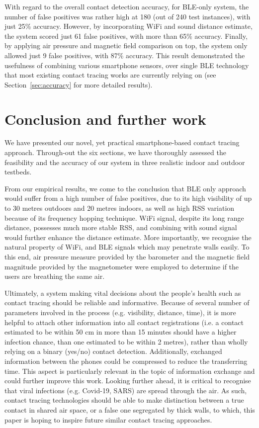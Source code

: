 \documentclass[graybox]{svmult}
\begin{document}
With regard to the overall contact detection accuracy, for BLE-only system, the number of false positives was rather high at 180 (out of 240 test instances), with just 25\% accuracy. However, by incorporating WiFi and sound distance estimate, the system scored just 61 false positives, with more than 65\% accuracy. Finally, by applying air pressure and magnetic field comparison on top, the system only allowed just 9 false positives, with 87\% accuracy. This result demonstrated the usefulness of combining various smartphone sensors, over single BLE technology that most existing contact tracing works are currently relying on (see Section~\ref{sec:accuracy} for more detailed results).





\section{Conclusion and further work}
We have presented our novel, yet practical smartphone-based contact tracing approach. Through-out the six sections, we have thoroughly assessed the feasibility and the accuracy of our system in three realistic indoor and outdoor testbeds.

From our empirical results, we come to the conclusion that BLE only approach would suffer from a high number of false positives, due to its high visibility of up to 30 metres outdoors and 20 metres indoors, as well as high RSS variation because of its frequency hopping technique. WiFi signal, despite its long range distance, possesses much more stable RSS, and combining with sound signal would further enhance the distance estimate. More importantly, we recognise the natural property of WiFi, and BLE signals which may penetrate walls easily. To this end, air pressure measure provided by the barometer and the magnetic field magnitude provided by the magnetometer were employed to determine if the users are breathing the same air.

Ultimately, a system making vital decisions about the people's health such as contact tracing should be reliable and informative. Because of several number of parameters involved in the process (e.g. visibility, distance, time), it is more helpful to attach other information into all contact registrations (i.e. a contact estimated to be within 50 cm in more than 15 minutes should have a higher infection chance, than one estimated to be within 2 metres), rather than wholly relying on a binary (yes/no) contact detection. Additionally, exchanged information between the phones could be compressed to reduce the transferring time. This aspect is particularly relevant in the topic of information exchange and could further improve this work. Looking further ahead, it is critical to recognise that viral infections (e.g. Covid-19, SARS) are spread through the air. As such, contact tracing technologies should be able to make distinction between a true contact in shared air space, or a false one segregated by thick walls, to which, this paper is hoping to inspire future similar contact tracing approaches.
\end{document}

